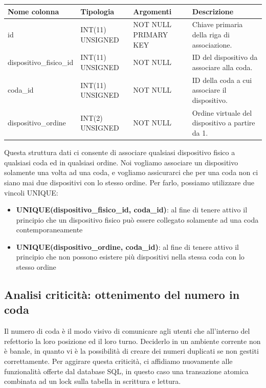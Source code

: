 \documentclass[a4paper, titlepage, 12pt, openright, twoside]{book}
\begin{document}
\begin{center}
    \begin{tabular}{ | l | l | p{3cm} | p{3cm} |}
    \hline
    Nome colonna & Tipologia & Argomenti & Descrizione \\ \hline
    id & INT(11) UNSIGNED & NOT NULL PRIMARY KEY & Chiave primaria della riga di associazione. \\ \hline
    dispositivo\_fisico\_id & INT(11) UNSIGNED & NOT NULL & ID del dispositivo da associare alla coda. \\ \hline
    coda\_id & INT(11) UNSIGNED & NOT NULL & ID della coda a cui associare il dispositivo. \\ \hline
    dispositivo\_ordine & INT(2) UNSIGNED & NOT NULL & Ordine virtuale del dispositivo a partire da 1. \\ \hline
    \end{tabular}
\end{center}

Questa struttura dati ci consente di associare qualsiasi dispositivo fisico a qualsiasi coda ed in qualsiasi ordine. Noi vogliamo associare un dispositivo solamente una volta ad una coda, e vogliamo assicurarci che per una coda non ci siano mai due dispositivi con lo stesso ordine. Per farlo, possiamo utilizzare due vincoli UNIQUE:
\begin{itemize}
	\item \textbf{UNIQUE(dispositivo\_fisico\_id, coda\_id)}: al fine di tenere attivo il principio che un dispositivo fisico può essere collegato solamente ad una coda contemporaneamente
	\item \textbf{UNIQUE(dispositivo\_ordine, coda\_id)}: al fine di tenere attivo il principio che non possono esistere più dispositivi nella stessa coda con lo stesso ordine
\end{itemize}

\subsection{Analisi criticità: ottenimento del numero in coda}

Il numero di coda è il modo visivo di comunicare agli utenti che all'interno del refettorio la loro posizione ed il loro turno. Deciderlo in un ambiente corrente non è banale, in quanto vi è la possibilità di creare dei numeri duplicati se non gestiti correttamente. Per aggirare questa criticità, ci affidiamo nuovamente alle funzionalità offerte dal database SQL, in questo caso una transazione atomica combinata ad un lock sulla tabella in scrittura e lettura.
\end{document}
